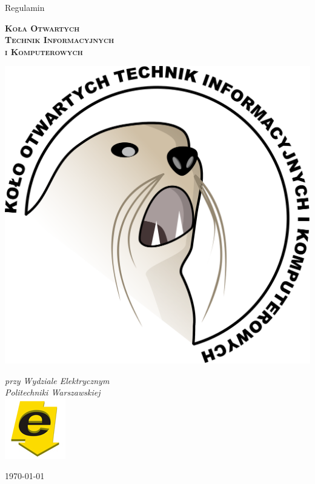 \documentclass[a4paper,11pt]{article}
\begin{document}
\begin{titlepage}
	\begin{center}
		\vspace{20pt}
			{\LARGE Regulamin} \\
			\vspace{10pt}
				\begin{huge}
					\textsc{\textbf{Koła Otwartych}} \\
					\vspace{5pt}
					\textsc{\textbf{Technik Informacyjnych}} \\
					\vspace{14pt}
					\textsc{\textbf{i Komputerowych}}
				\end{huge}
		\vspace{40pt}
		
		\includegraphics[scale=0.4]{duzy-kotik.png}
		
		\vfill
		
		\textit{przy Wydziale Elektrycznym} \\
		\textit{Politechniki Warszawskiej} \\
		\vspace{10pt}
		\includegraphics[scale=0.3]{ee.jpg}
			
		\vfill
		
		\today
	\end{center}
\end{titlepage}
\end{document}
